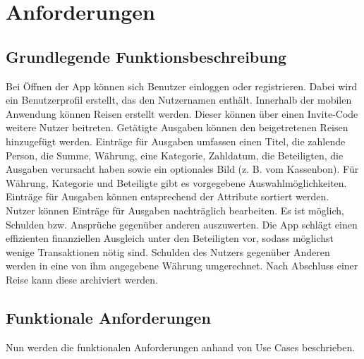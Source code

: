 \section{Anforderungen}

\subsection{Grundlegende Funktionsbeschreibung}

Bei Öffnen der App können sich Benutzer einloggen oder registrieren.
Dabei wird ein Benutzerprofil erstellt, das den Nutzernamen enthält.
Innerhalb der mobilen Anwendung können Reisen erstellt werden. Dieser können über einen Invite-Code weitere Nutzer beitreten.
Getätigte Ausgaben können den beigetretenen Reisen hinzugefügt werden.
Einträge für Ausgaben umfassen einen Titel, die zahlende Person, die Summe,
Währung, eine Kategorie, Zahldatum, die Beteiligten, die Ausgaben verursacht haben sowie ein optionales Bild (z. B. vom Kassenbon).
Für Währung, Kategorie und Beteiligte gibt es vorgegebene Auswahlmöglichkeiten.
Einträge für Ausgaben können entsprechend der Attribute sortiert werden.
Nutzer können Einträge für Ausgaben nachträglich bearbeiten.
Es ist möglich, Schulden bzw. Ansprüche gegenüber anderen auszuwerten.
Die App schlägt einen effizienten finanziellen Ausgleich unter den Beteiligten vor, sodass möglichst wenige Transaktionen nötig sind.
Schulden des Nutzers gegenüber Anderen werden in eine von ihm angegebene Währung umgerechnet.
Nach Abschluss einer Reise kann diese archiviert werden.

\subsection{Funktionale Anforderungen}
Nun werden die funktionalen Anforderungen anhand von Use Cases beschrieben.


